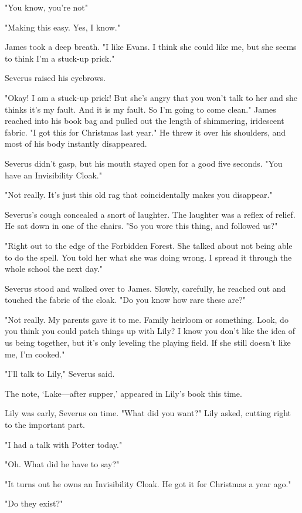 "You know, you're not{\el}"

"Making this easy. Yes, I know."

James took a deep breath. "I like Evans. I think she could like me, but she seems to think I'm a stuck-up prick."

Severus raised his eyebrows.

"Okay! I am a stuck-up prick! But she's angry that you won't talk to her and she thinks it's my fault. And it is my fault. So I'm going to come clean." James reached into his book bag and pulled out the length of shimmering, iridescent fabric. "I got this for Christmas last year." He threw it over his shoulders, and most of his body instantly disappeared.

Severus didn't gasp, but his mouth stayed open for a good five seconds. "You have an Invisibility Cloak."

"Not really. It's just this old rag that coincidentally makes you disappear."

Severus's cough concealed a snort of laughter. The laughter was a reflex of relief. He sat down in one of the chairs. "So you wore this{\el} thing, and followed us?"

"Right out to the edge of the Forbidden Forest. She talked about not being able to do the spell. You told her what she was doing wrong. I spread it through the whole school the next day."

Severus stood and walked over to James. Slowly, carefully, he reached out and touched the fabric of the cloak. "Do you know how rare these are?"

"Not really. My parents gave it to me. Family heirloom or something. Look, do you think you could patch things up with Lily? I know you don't like the idea of us being together, but it's only leveling the playing field. If she still doesn't like me, I'm cooked."

"I'll talk to Lily," Severus said.

The note, `Lake—after supper,' appeared in Lily's book this time.

Lily was early, Severus on time. "What did you want?" Lily asked, cutting right to the important part.

"I had a talk with Potter today."

"Oh. What did he have to say?"

"It turns out he owns an Invisibility Cloak. He got it for Christmas a year ago."

"Do they exist?"

